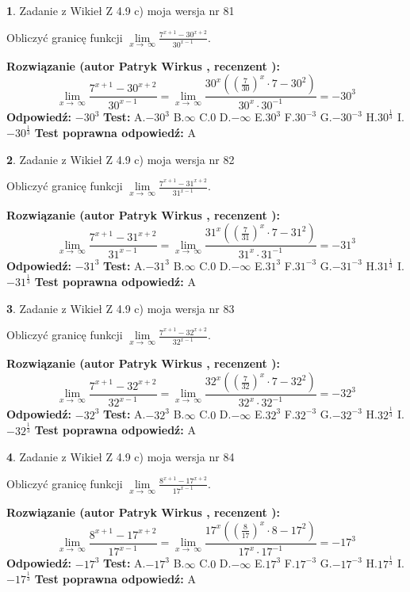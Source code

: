 \documentclass[12pt, a4paper]{article}
\theoremstyle{definition} %
\newtheorem{zad}{}
\newcommand{\zadStart}[1]{\begin{zad}#1\newline}
\newcommand{\zadStop}{\end{zad}}
\newcommand{\rozwStart}[2]{\noindent \textbf{Rozwiązanie (autor #1 , recenzent #2): }\newline}
\newcommand{\rozwStop}{\newline}
\newcommand{\odpStart}{\noindent \textbf{Odpowiedź:}\newline}
\newcommand{\odpStop}{\newline}
\newcommand{\testStart}{\noindent \textbf{Test:}\newline}
\newcommand{\testStop}{\newline}
\newcommand{\kluczStart}{\noindent \textbf{Test poprawna odpowiedź:}\newline}
\newcommand{\kluczStop}{\newline}
\begin{document}
\zadStart{Zadanie z Wikieł Z 4.9 c) moja wersja nr 81}


Obliczyć granicę funkcji  $\lim\limits_{x\to\ \infty}\frac{7^{x+1}-30^{x+2}}{30^{x-1}}$.
\zadStop
\rozwStart{Patryk Wirkus}{}
$$\lim\limits_{x\to\ \infty}\frac{7^{x+1}-30^{x+2}}{30^{x-1}}=\lim\limits_{x\to\ \infty}\frac{30^{x}((\frac{7}{30})^{x}\cdot 7 -30^{2})}{30^{x}\cdot 30^{-1}} = -30^{3}$$
\rozwStop
\odpStart
$-30^{3}$
\odpStop
\testStart
A.$-30^{3}$ B.$\infty$ C.$0$ D.$-\infty$ E.$30^{3}$
F.$30^{-3}$ G.$-30^{-3}$
H.$30^{\frac{1}{3}}$
I.$-30^{\frac{1}{3}}$
\testStop
\kluczStart
A
\kluczStop



\zadStart{Zadanie z Wikieł Z 4.9 c) moja wersja nr 82}


Obliczyć granicę funkcji  $\lim\limits_{x\to\ \infty}\frac{7^{x+1}-31^{x+2}}{31^{x-1}}$.
\zadStop
\rozwStart{Patryk Wirkus}{}
$$\lim\limits_{x\to\ \infty}\frac{7^{x+1}-31^{x+2}}{31^{x-1}}=\lim\limits_{x\to\ \infty}\frac{31^{x}((\frac{7}{31})^{x}\cdot 7 -31^{2})}{31^{x}\cdot 31^{-1}} = -31^{3}$$
\rozwStop
\odpStart
$-31^{3}$
\odpStop
\testStart
A.$-31^{3}$ B.$\infty$ C.$0$ D.$-\infty$ E.$31^{3}$
F.$31^{-3}$ G.$-31^{-3}$
H.$31^{\frac{1}{3}}$
I.$-31^{\frac{1}{3}}$
\testStop
\kluczStart
A
\kluczStop



\zadStart{Zadanie z Wikieł Z 4.9 c) moja wersja nr 83}


Obliczyć granicę funkcji  $\lim\limits_{x\to\ \infty}\frac{7^{x+1}-32^{x+2}}{32^{x-1}}$.
\zadStop
\rozwStart{Patryk Wirkus}{}
$$\lim\limits_{x\to\ \infty}\frac{7^{x+1}-32^{x+2}}{32^{x-1}}=\lim\limits_{x\to\ \infty}\frac{32^{x}((\frac{7}{32})^{x}\cdot 7 -32^{2})}{32^{x}\cdot 32^{-1}} = -32^{3}$$
\rozwStop
\odpStart
$-32^{3}$
\odpStop
\testStart
A.$-32^{3}$ B.$\infty$ C.$0$ D.$-\infty$ E.$32^{3}$
F.$32^{-3}$ G.$-32^{-3}$
H.$32^{\frac{1}{3}}$
I.$-32^{\frac{1}{3}}$
\testStop
\kluczStart
A
\kluczStop



\zadStart{Zadanie z Wikieł Z 4.9 c) moja wersja nr 84}


Obliczyć granicę funkcji  $\lim\limits_{x\to\ \infty}\frac{8^{x+1}-17^{x+2}}{17^{x-1}}$.
\zadStop
\rozwStart{Patryk Wirkus}{}
$$\lim\limits_{x\to\ \infty}\frac{8^{x+1}-17^{x+2}}{17^{x-1}}=\lim\limits_{x\to\ \infty}\frac{17^{x}((\frac{8}{17})^{x}\cdot 8 -17^{2})}{17^{x}\cdot 17^{-1}} = -17^{3}$$
\rozwStop
\odpStart
$-17^{3}$
\odpStop
\testStart
A.$-17^{3}$ B.$\infty$ C.$0$ D.$-\infty$ E.$17^{3}$
F.$17^{-3}$ G.$-17^{-3}$
H.$17^{\frac{1}{3}}$
I.$-17^{\frac{1}{3}}$
\testStop
\kluczStart
A
\kluczStop
\end{document}
